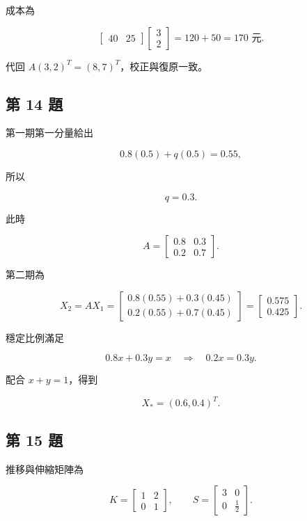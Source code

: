 \documentclass[11pt,a4paper]{article}
\begin{document}
成本為

\[
\begin{bmatrix}40&25\end{bmatrix}
\begin{bmatrix}3\\2\end{bmatrix}
=120+50
=\boxed{170\text{ 元}}.
\]

代回 \(A(3,2)^T=(8,7)^T\)，校正與復原一致。

\subsection{第 14 題}\label{ux7b2c-14-ux984c}

第一期第一分量給出

\[
0.8(0.5)+q(0.5)=0.55,
\]

所以

\[
\boxed{q=0.3}.
\]

此時

\[
A=\begin{bmatrix}0.8&0.3\\0.2&0.7\end{bmatrix}.
\]

第二期為

\[
X_2=AX_1
=
\begin{bmatrix}
0.8(0.55)+0.3(0.45)\\
0.2(0.55)+0.7(0.45)
\end{bmatrix}
=
\boxed{\begin{bmatrix}0.575\\0.425\end{bmatrix}}.
\]

穩定比例滿足

\[
0.8x+0.3y=x
\quad\Longrightarrow\quad
0.2x=0.3y.
\]

配合 \(x+y=1\)，得到

\[
\boxed{X_*=(0.6,0.4)^T}.
\]

\subsection{第 15 題}\label{ux7b2c-15-ux984c}

推移與伸縮矩陣為

\[
K=\begin{bmatrix}1&2\\0&1\end{bmatrix},
\qquad
S=\begin{bmatrix}3&0\\0&\tfrac12\end{bmatrix}.
\]
\end{document}

